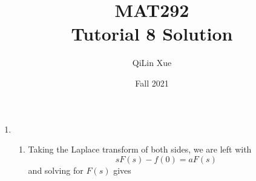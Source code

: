 \documentclass{article}
\title{MAT292 \\ Tutorial 8 Solution}
\author{QiLin Xue}
\date{Fall 2021}
\begin{document}
\newcommand{\tabitem}{~~\llap{\textbullet}~~}

\maketitle
\begin{enumerate}
    \item  \begin{enumerate}\begin{enumerate}
        \item \begin{align}
            \mathcal{L}\{Ce^{at}\} &= \int_0^\infty Ce^{(a-s)t}\dd{t} \\ 
                                   &= \frac{C}{s-a}
        \end{align}
        \item \begin{align}
            \mathcal{L}\{e^t\sin t\} &= \int_0^\infty e^{(1-s)t}\sin t \dd{t} \\ 
            &= \frac{1}{2i} \int_0^\infty e^{(1-s+i)t} - e^{(1-s-i)t} \dd{t} \\ 
            &= \frac{1}{2i} \frac{1}{s-1-i} - \frac{1}{2i} \frac{1}{s-1+i} \\ 
            &= \frac{1}{2i} \left(\frac{2i}{(s-1)^2+1}\right) \\ 
            &= \frac{1}{(s-1)^2+1}
        \end{align}
        \item \begin{align}
            \mathcal{L}\{e^t\cos t\} &= \int_0^\infty e^{(1-s)t}\cos t \dd{t} \\ 
            &= \frac{1}{2} \int_0^\infty e^{(1-s+i)t} + e^{(1-s-i)t} \dd{t} \\ 
            &= \frac{1}{2} \frac{1}{s-1-i} + \frac{1}{2i} \frac{1}{s-1+i} \\ 
            &= \frac{1}{2} \left(\frac{2(s-1)}{(s-1)^2+1}\right) \\ 
            &= \frac{s-1}{(s-1)^2+1}
        \end{align}
    \end{enumerate}
    \item Taking the Laplace transform of both sides, we are left with
    \begin{equation}
        sF(s)-f(0) = aF(s)
    \end{equation}
    and solving for $F(s)$ gives 
    \begin{equation}

\end{equation}
\end{enumerate}
\end{enumerate}
\end{document}
